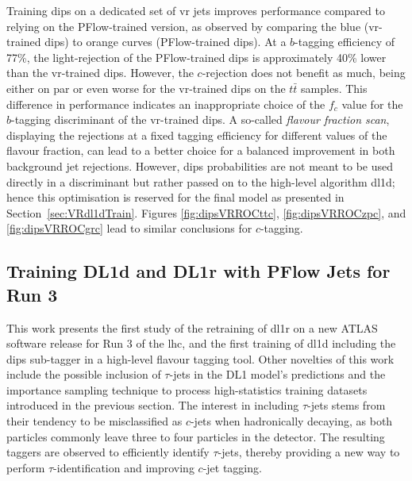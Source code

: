 Training \gls{dips} on a dedicated set of \gls{vr} jets improves performance compared to relying on the PFlow-trained version, as observed by comparing the blue (\gls{vr}-trained \gls{dips}) to orange curves (PFlow-trained \gls{dips}). At a $b$-tagging efficiency of 77\%, the light-rejection of the PFlow-trained \gls{dips} is approximately 40\% lower than the \gls{vr}-trained \gls{dips}. However, the $c$-rejection does not benefit as much, being either on par or even worse for the \gls{vr}-trained \gls{dips} on the $t\bar{t}$ samples. This difference in performance indicates an inappropriate choice of the $f_c$ value for the $b$-tagging discriminant of the \gls{vr}-trained \gls{dips}. A so-called \textit{flavour fraction scan}, displaying the rejections at a fixed tagging efficiency for different values of the flavour fraction, can lead to a better choice for a balanced improvement in both background jet rejections. However, \gls{dips} probabilities are not meant to be used directly in a discriminant but rather passed on to the high-level algorithm \gls{dl1d}; hence this optimisation is reserved for the final model as presented in Section~\ref{sec:VRdl1dTrain}. Figures \ref{fig:dipsVRROCttc}, \ref{fig:dipsVRROCzpc}, and \ref{fig:dipsVRROCgrc} lead to similar conclusions for $c$-tagging.

\subsection{Training DL1d and DL1r with PFlow Jets for Run 3}
This work presents the first study of the retraining of \gls{dl1r} on a new ATLAS software release for Run 3 of the \gls{lhc}, and the first training of \gls{dl1d} including the \gls{dips} sub-tagger in a high-level flavour tagging tool. Other novelties of this work include the possible inclusion of $\tau$-jets in the DL1 model's predictions and the importance sampling technique to process high-statistics training datasets introduced in the previous section. The interest in including $\tau$-jets stems from their tendency to be misclassified as $c$-jets when hadronically decaying, as both particles commonly leave three to four particles in the detector. The resulting taggers are observed to efficiently identify $\tau$-jets, thereby providing a new way to perform $\tau$-identification and improving $c$-jet tagging.\\ %


